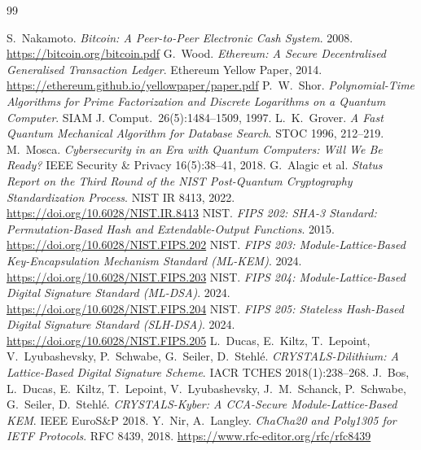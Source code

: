 \documentclass[11pt]{article}
\theoremstyle{plain}
\theoremstyle{definition}
\theoremstyle{remark}
\begin{document}
\begin{thebibliography}{99}

 S.~Nakamoto. \emph{Bitcoin: A Peer-to-Peer Electronic Cash System}. 2008. \url{https://bitcoin.org/bitcoin.pdf}
 G.~Wood. \emph{Ethereum: A Secure Decentralised Generalised Transaction Ledger}. Ethereum Yellow Paper, 2014. \url{https://ethereum.github.io/yellowpaper/paper.pdf}
 P.~W.~Shor. \emph{Polynomial-Time Algorithms for Prime Factorization and Discrete Logarithms on a Quantum Computer}. SIAM J. Comput.\ 26(5):1484--1509, 1997.
 L.~K.~Grover. \emph{A Fast Quantum Mechanical Algorithm for Database Search}. STOC 1996, 212--219.
 M.~Mosca. \emph{Cybersecurity in an Era with Quantum Computers: Will We Be Ready?} IEEE Security \& Privacy 16(5):38--41, 2018.
 G.~Alagic et al. \emph{Status Report on the Third Round of the NIST Post-Quantum Cryptography Standardization Process}. NIST IR 8413, 2022. \url{https://doi.org/10.6028/NIST.IR.8413}
 NIST. \emph{FIPS 202: SHA-3 Standard: Permutation-Based Hash and Extendable-Output Functions}. 2015. \url{https://doi.org/10.6028/NIST.FIPS.202}
 NIST. \emph{FIPS 203: Module-Lattice-Based Key-Encapsulation Mechanism Standard (ML-KEM)}. 2024. \url{https://doi.org/10.6028/NIST.FIPS.203}
 NIST. \emph{FIPS 204: Module-Lattice-Based Digital Signature Standard (ML-DSA)}. 2024. \url{https://doi.org/10.6028/NIST.FIPS.204}
 NIST. \emph{FIPS 205: Stateless Hash-Based Digital Signature Standard (SLH-DSA)}. 2024. \url{https://doi.org/10.6028/NIST.FIPS.205}
 L.~Ducas, E.~Kiltz, T.~Lepoint, V.~Lyubashevsky, P.~Schwabe, G.~Seiler, D.~Stehl\'e. \emph{CRYSTALS-Dilithium: A Lattice-Based Digital Signature Scheme}. IACR TCHES 2018(1):238--268.
 J.~Bos, L.~Ducas, E.~Kiltz, T.~Lepoint, V.~Lyubashevsky, J.~M.~Schanck, P.~Schwabe, G.~Seiler, D.~Stehl\'e. \emph{CRYSTALS-Kyber: A CCA-Secure Module-Lattice-Based KEM}. IEEE EuroS\&P 2018.
 Y.~Nir, A.~Langley. \emph{ChaCha20 and Poly1305 for IETF Protocols}. RFC 8439, 2018. \url{https://www.rfc-editor.org/rfc/rfc8439}

\end{thebibliography}
\end{document}
